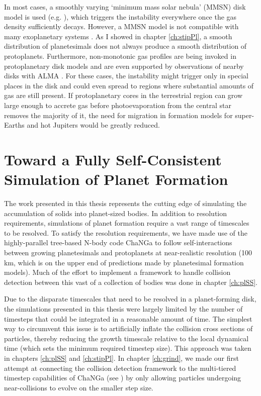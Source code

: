In most cases, a smoothly varying `minimum mass solar nebula' (MMSN) disk model is used (e.g. \cite{kominami02, dawson15}), which triggers the instability everywhere once the gas density sufficiently decays. However, a MMSN model is not compatible with many exoplanetary systems \cite{chiang13, schlichting14}. As I showed in chapter \ref{ch:stipPl}, a smooth distribution of planetesimals does not always produce a smooth distribution of protoplanets. Furthermore, non-monotonic gas profiles are being invoked in protoplanetary disk models \cite{chatterjee14, ogihara15} and are even supported by observations of nearby disks with ALMA \cite{isella16, andrews16}. For these cases, the instability might trigger only in special places in the disk and could even spread to regions where substantial amounts of gas are still present. If protoplanetary cores in the terrestrial region can grow large enough to accrete gas before photoevaporation from the central star removes the majority of it, the need for migration in formation models for super-Earths and hot Jupiters would be greatly reduced.

\section{Toward a Fully Self-Consistent Simulation of Planet Formation}

The work presented in this thesis represents the cutting edge of simulating the accumulation of solids into planet-sized bodies. In addition to resolution requirements, simulations of planet formation require a vast range of timescales to be resolved. To satisfy the resolution requirements, we have made use of the highly-parallel tree-based N-body code {\sc ChaNGa} to follow self-interactions between growing planetesimals and protoplanets at near-realistic resolution (100 km, which is on the upper end of predictions made by planetesimal formation models). Much of the effort to implement a framework to handle collision detection between this vast of a collection of bodies was done in chapter \ref{ch:plSS}.

Due to the disparate timescales that need to be resolved in a planet-forming disk, the simulations presented in this thesis were largely limited by the number of timesteps that could be integrated in a reasonable amount of time. The simplest way to circumvent this issue is to artificially inflate the collision cross sections of particles, thereby reducing the growth timescale relative to the local dynamical time (which sets the minimum required timestep size). This approach was taken in chapters \ref{ch:plSS} and \ref{ch:stipPl}. In chapter \ref{ch:grind}, we made our first attempt at connecting the collision detection framework to the multi-tiered timestep capabilities of {\sc ChaNGa} (see \cite{menon15}) by only allowing particles undergoing near-collisions to evolve on the smaller step size.

